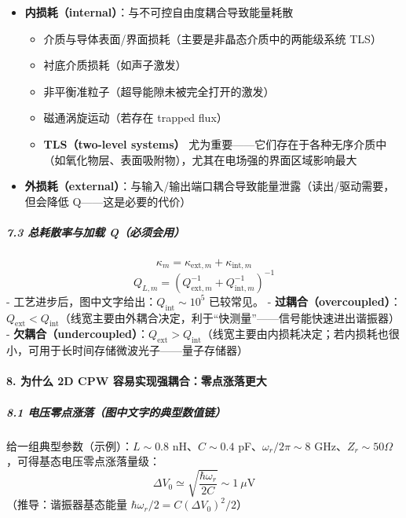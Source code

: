 \documentclass[12pt,a4paper,oneside]{ctexbook}
\providecommand{\tightlist}{%
  \setlength{\itemsep}{0pt}\setlength{\parskip}{0pt}}
\let\oldparagraph\paragraph
\renewcommand{\paragraph}[1]{\oldparagraph{#1}\mbox{}}
\let\oldsubparagraph\subparagraph
\renewcommand{\subparagraph}[1]{\oldsubparagraph{#1}\mbox{}}
\begin{document}
\begin{itemize}
\tightlist
\item
  \textbf{内损耗（internal）}：与不可控自由度耦合导致能量耗散

  \begin{itemize}
  \tightlist
  \item
    介质与导体表面/界面损耗（主要是非晶态介质中的两能级系统 TLS）
  \item
    衬底介质损耗（如声子激发）
  \item
    非平衡准粒子（超导能隙未被完全打开的激发）
  \item
    磁通涡旋运动（若存在 trapped flux）
  \item
    \textbf{TLS（two-level systems）}
    尤为重要------它们存在于各种无序介质中（如氧化物层、表面吸附物），尤其在电场强的界面区域影响最大
  \end{itemize}
\item
  \textbf{外损耗（external）}：与输入/输出端口耦合导致能量泄露（读出/驱动需要，但会降低
  Q------这是必要的代价）
\end{itemize}

\subparagraph{7.3 总耗散率与加载
Q（必须会用）}\label{ux603bux8017ux6563ux7387ux4e0eux52a0ux8f7d-qux5fc5ux987bux4f1aux7528}

\[\kappa_m=\kappa_{\text{ext},m}+\kappa_{\text{int},m}\]
\[Q_{L,m}=\left(Q_{\text{ext},m}^{-1}+Q_{\text{int},m}^{-1}\right)^{-1}\]
- 工艺进步后，图中文字给出：\textbf{\(Q_{\text{int}}\sim 10^5\)}
已较常见。 -
\textbf{过耦合（overcoupled）}：\(Q_{\text{ext}}<Q_{\text{int}}\)（线宽主要由外耦合决定，利于``快测量''------信号能快速进出谐振器）
-
\textbf{欠耦合（undercoupled）}：\(Q_{\text{ext}}>Q_{\text{int}}\)（线宽主要由内损耗决定；若内损耗也很小，可用于长时间存储微波光子------量子存储器）


\paragraph{8. 为什么 2D CPW
容易实现强耦合：零点涨落更大}\label{ux4e3aux4ec0ux4e48-2d-cpw-ux5bb9ux6613ux5b9eux73b0ux5f3aux8026ux5408ux96f6ux70b9ux6da8ux843dux66f4ux5927}

\subparagraph{8.1
电压零点涨落（图中文字的典型数值链）}\label{ux7535ux538bux96f6ux70b9ux6da8ux843dux56feux4e2dux6587ux5b57ux7684ux5178ux578bux6570ux503cux94fe}

给一组典型参数（示例）：\(L\sim0.8\) nH、\(C\sim0.4\)
pF、\(\omega_r/2\pi\sim 8\)
GHz、\(Z_r\sim50\Omega\)，可得基态电压零点涨落量级：
\[\Delta V_0\simeq \sqrt{\frac{\hbar\omega_r}{2C}}\sim 1~\mu\text{V}\]
（推导：谐振器基态能量 \(\hbar\omega_r/2 = C(\Delta V_0)^2/2\)）
\end{document}
